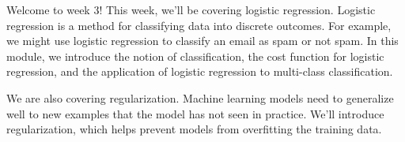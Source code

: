 Welcome to week 3! This week, we’ll be covering logistic regression. Logistic regression is a method for classifying data into discrete outcomes. For example, we might use logistic regression to classify an email as spam or not spam. In this module, we introduce the notion of classification, the cost function for logistic regression, and the application of logistic regression to multi-class classification.

We are also covering regularization. Machine learning models need to generalize well to new examples that the model has not seen in practice. We’ll introduce regularization, which helps prevent models from overfitting the training data. 

